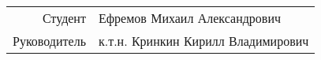 \begin{frame}
\titlepage
	  \vspace{-6em}
 	  \centering
	  \begin{tabular}{r|l}
  	  	Студент & Ефремов Михаил Александрович \\
  	  	Руководитель & к.т.н. Кринкин Кирилл Владимирович
	  \end{tabular}
\end{frame}